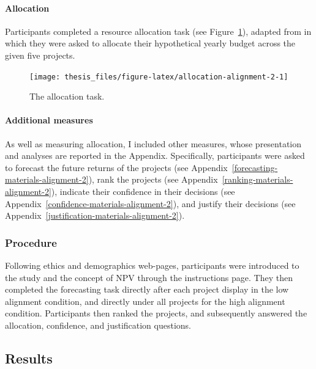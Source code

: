 \documentclass[a4paper, nobind, dvipsnames]{templates/ociamthesis}
\theoremstyle{definition}
\theoremstyle{definition}
\theoremstyle{definition}
\theoremstyle{definition}
\theoremstyle{remark}
\begin{document}
\hypertarget{allocation}{%
\paragraph{Allocation}\label{allocation}}

Participants completed a resource allocation task (see
Figure~\ref{fig:allocation-alignment-2}), adapted from \textcite{bardolet2011} in which
they were asked to allocate their hypothetical yearly budget across the given
five projects.



\begin{figure}
\texttt{[image: thesis\_files/figure-latex/allocation-alignment-2-1]} \caption{The allocation task.}\label{fig:allocation-alignment-2}
\end{figure}

\hypertarget{additional-measures}{%
\paragraph{Additional measures}\label{additional-measures}}

As well as measuring allocation, I included other measures, whose presentation
and analyses are reported in the Appendix. Specifically, participants were asked
to forecast the future returns of the projects (see
Appendix~\ref{forecasting-materials-alignment-2}), rank the projects (see
Appendix~\ref{ranking-materials-alignment-2}), indicate their confidence in
their decisions (see Appendix~\ref{confidence-materials-alignment-2}), and
justify their decisions (see
Appendix~\ref{justification-materials-alignment-2}).

\hypertarget{procedure-2}{%
\subsubsection{Procedure}\label{procedure-2}}

Following ethics and demographics web-pages, participants were introduced to the
study and the concept of NPV through the instructions page. They then completed
the forecasting task directly after each project display in the low alignment
condition, and directly under all projects for the high alignment condition.
Participants then ranked the projects, and subsequently answered the allocation,
confidence, and justification questions.

\hypertarget{results}{%
\subsection{Results}\label{results}}
\end{document}
